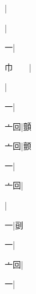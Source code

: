 \begin{multicols}{2}
{{\cjk{}{\cnsym{}　}{\cnsym{}　}{\cnsym{}　}}|{}\par
{\cjk{}{\cnsym{}　}{\cnsym{}　}{\cnsym{}　}}|{}\par
{一}|{}\par
{\cjk{}巾{\cnsym{}　}{\cnsym{}　}}|{}\par
{\cjk{}{\cnsym{}　}{\cnsym{}　}{\cnsym{}　}}|{}\par
{\cjk{}{\cnsym{}　}{\cnsym{}　}一}|{}\par
{\cjk{}{\cnsym{}　}亠回}|{\cjk{}顫}\par
{\cjk{}{\cnsym{}　}亠回}|{\cjk{}颤}\par
{一}|{}\par
{\cjk{}{\cnsym{}　}亠回}|{}\par
{\cjk{}{\cnsym{}　}{\cnsym{}　}{\cnsym{}　}}|{}\par
{\cjk{}{\cnsym{}　}{\cnsym{}　}一}|{\cjk{}刯}\par
{一}|{}\par
{\cjk{}{\cnsym{}　}亠回}|{}\par
{\cjk{}{\cnsym{}　}{\cnsym{}　}一}|{}\par
}
\end{multicols}
